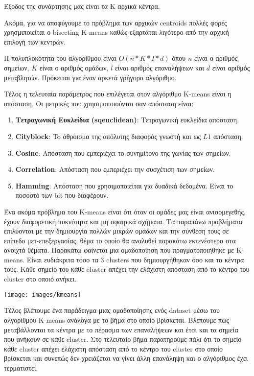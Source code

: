 Έξοδος της συνάρτησης μας είναι τα Κ αρχικά κέντρα.


Ακόμα, για να αποφύγουμε το πρόβλημα των αρχικών centroids πολλές φορές χρησμιποιείται ο bisecting K-means καθώς εξαρτάται λιγότερο από την αρχική επιλογή των κεντρών.

Η πολυπλοκότητα του αλγορίθμου είναι $ O(n*K*I*d)$ όπου $n$ είναι ο αριθμός σημείων, $Κ$ είναι ο αριθμός ομάδων, $l$ είναι αριθμός επαναλήψεων και $d$ είναι αριθμός μεταβλητών. Πρόκειται για έναν αρκετά γρήγορο αλγόριθμο.

Τέλος η τελευταία παράμετρος που επιλέγεται στον αλγόριθμο K-means είναι η απόσταση. Οι μετρικές που χρησιμοποιούνται σαν απόσταση είναι:
\begin{enumerate}
    \item \textbf{Τετραγωνική Ευκλείδια (sqeuclidean)}: Τετραγωνική ευκλείδια απόσταση.
    \item \textbf{Cityblock}: To άθροισμα της απόλυτης διαφοράς γνωστή και ως $L1$ απόσταση.
    \item \textbf{Cosine}: Απόσταση που εμπεριέχει το συνημίτονο της γωνίας των σημείων.
    \item \textbf{Correlation}: Απόσταση που εμπεριέχει την συσχέτιση των σημείων.
    \item \textbf{Hamming}: Απόσταση που χρησιμοποιείται για δυαδικά δεδομένα. Είναι το ποσοστό των bit που διαφέρουν.
\end{enumerate}

Ένα ακόμα πρόβλημα του K-means είναι ότι όταν οι ομάδες μας είναι ανισομεγεθής, έχουν διαφορετική πυκνότητα και μη σφαιρικά σχήματα. Τα παραπάνω προβλήματα επιλύονται με την δημιουργία πολλών μικρών ομάδων και την σύνθεση τους σε επίπεδο μετ-επεξεργασίας, θέμα το οποίο θα αναλυθεί παρακάτω εκτενέστερα στα ανοιχτά θέματα.
Παρακάτω φαίνεται μια ομαδοποίηση που πραγματοποιήθηκε με K-means. Είναι ευδιάκριτα τόσο τα 3 clusters που δημιουργήθηκαν όσο και τα κέντρα τους. Κάθε σημείο του κάθε cluster απέχει την ελάχιστη απόσταση από το κέντρο του cluster στο οποιό ανήκει.

\noindent\begin{minipage}{\linewidth}
    \centering
    \texttt{[image: images/kmeans]}
    \label{fig:kmeans}
\end{minipage}

Τέλος βλέπουμε ένα παράδειγμα μιας ομαδοποίησης ενός dataset μέσω του αλγορίθμου K-means ανάλογα με το βήμα στο οποίο βρίσκεται. Βλέπουμε πως μεταβάλλονται τα κέντρα με το πέρασμα των επαναλήψεων και έτσι και τα σημεία που ανήκουν σε κάθε cluster. Στο τελευταίο βήμα παρατηρούμε πάλι ότι το σημείο κάθε cluster απέχει ελάχιστη απόσταση από το κέντρο του cluster στο οποίο βρίσκεται και συνεπώς δεν χρειάζεται να γίνει άλλη επανάληψη και ο αλγόριθμος έχει τερματιστεί.

